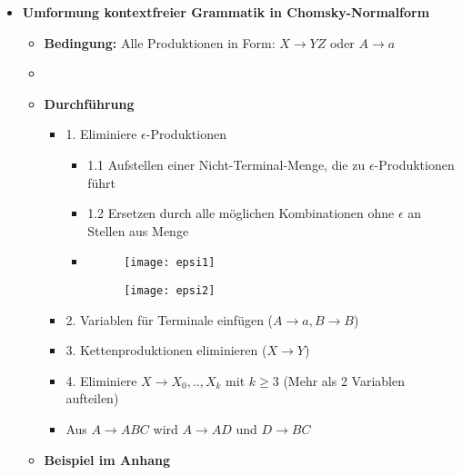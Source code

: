 \begin{itemize}
\item {\large \textbf{Umformung kontextfreier Grammatik in Chomsky-Normalform}}
	\begin{itemize}
	\item \textbf{Bedingung:} Alle Produktionen in Form: $X \rightarrow YZ$ oder $A \rightarrow a$
	\item[]
	\item \textbf{Durchführung}
		\begin{itemize}
		\item 1. Eliminiere $\epsilon$-Produktionen	
			\begin{itemize}
			\item 1.1 Aufstellen einer Nicht-Terminal-Menge, die zu $\epsilon$-Produktionen führt
			\item 1.2 Ersetzen durch alle möglichen Kombinationen ohne $\epsilon$ an Stellen aus Menge
			\item[]
				\begin{minipage}{0.4\textwidth}
					\begin{figure}[H]
					\texttt{[image: epsi1]}
					\end{figure}
				\end{minipage}
				\begin{minipage}[t]{0.4\textwidth}
					\vspace{-1cm}
					\begin{figure}[H]
					\texttt{[image: epsi2]}
					\end{figure}
				\end{minipage}
			\end{itemize}
		\item 2. Variablen für Terminale einfügen ($A \rightarrow a, B \rightarrow B$)
		\item 3. Kettenproduktionen eliminieren ($X \rightarrow Y$)
		\item 4. Eliminiere $X \rightarrow X_0,..,X_k$ mit $k \geq 3$ (Mehr als 2 Variablen aufteilen)
		\item Aus $A \rightarrow ABC$ wird $A \rightarrow AD$ und $D \rightarrow BC$
		\end{itemize}
		
	\item \textbf{Beispiel im Anhang}
	\end{itemize}



\end{itemize}
